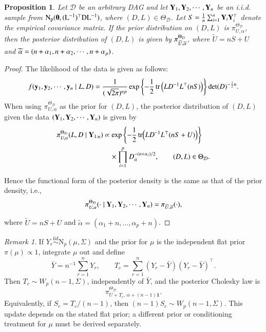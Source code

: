 \documentclass[12pt]{article}
\DeclareMathOperator{\tr}{tr}
\newcommand{\D}{\mathcal{D}}
\theoremstyle{plain}
\newtheorem{proposition}[theorem]{Proposition}
\theoremstyle{definition}
\theoremstyle{remark}
\newtheorem{Rem}[theorem]{Remark}
\begin{document}
\begin{proposition}\label{lem:pd}
Let $\D$ be an arbitrary DAG and let ${\bf Y}_1, {\bf Y}_2, \cdots, {\bf Y}_n$ be an i.i.d. sample from $\rm{N}_{p} ({\bf 0}, (L^{-1})^{\top}DL^{-1})$, where
$(D, L) \in \Theta_{\D}$. Let $S = \frac{1}{n} \sum_{i=1}^n {\bf Y}_i {\bf Y}_i^{\top}$ denote the empirical
covariance matrix. If the prior distribution on $(D, L)$ is $\pi_{U,\alpha}^{\Theta_{\D}}$, then the posterior distribution
of $(D, L)$ is given by $\pi_{\widetilde{U}, \widetilde{\bf \alpha}}^{\Theta_{\D}}$, where $\widetilde{U} = nS + U$ and $\widetilde{\bf \alpha} = (n + \alpha_1, n + \alpha_2, \cdots, n + \alpha_{p})$.
\end{proposition}
\begin{proof}
The likelihood of the data is given as follows:
\[
f({\bf y}_1, {\bf y}_2, \cdots, {\bf y}_n \mid L, D) = \frac{1}{(\sqrt{2 \pi})^{np}}\exp\left\{-
\frac{1}{2}\tr \left(LD^{-1}L^{\top} (nS) \right)\right\}\det(D)^{-\frac{1}{2}n}.
\]
\noindent When using $\pi_{U,\alpha}^{\Theta_{\D}}$ as the prior for $(D, L)$, the posterior distribution of $(D, L)$ given the
data $({\bf Y}_1, {\bf Y}_2, \cdots, {\bf Y}_n)$ is given by
\begin{equation}\label{eq:wishart_on_theta}
\begin{aligned}
\pi_{U,\alpha}^{\Theta_{\D}}(L,D\mid{\bf Y}_{1:n})
&\propto
\exp\left\{-\frac12\tr\!\left(LD^{-1}L^\top(nS+U)\right)\right\}\\
&\quad{}\times\prod_{i=1}^{p}D_{ii}^{-(n+\alpha_i)/2},
\qquad (D,L)\in\Theta_{\D}.
\end{aligned}
\end{equation}

\noindent
Hence the functional form of the posterior density is the same as that of the prior density, i.e.,
$$
\pi_{U,\alpha}^{\Theta_{\D}} ( \cdot \mid {\bf Y}_1, {\bf Y}_2, \cdots, {\bf Y}_n) =
\pi_{\widetilde{U}, \widetilde{\bf \alpha}} ( \cdot ),
$$

\noindent
where $\widetilde{U} = nS + U$ and $\widetilde{\alpha}= (\alpha_1+n,\ldots,\alpha_{p}+n)$.
\end{proof}
\begin{Rem}\label{rem:unknown-mean}
If \(Y_r\stackrel{\mathrm{iid}}{\sim}\mathrm{N}_p(\mu,\Sigma)\) and
the prior for \(\mu\) is the independent flat prior
\(\pi(\mu)\propto1\), integrate \(\mu\) out and define
\[
\bar Y=n^{-1}\sum_{r=1}^nY_r,\qquad
T_c=\sum_{r=1}^n(Y_r-\bar Y)(Y_r-\bar Y)^\top .
\]
Then \(T_c\sim W_p(n-1,\Sigma)\), independently of \(\bar Y\), and the
posterior Cholesky law is
\[
\pi_{U+T_c,\,\alpha+(n-1)\mathbf{1}}^{\Theta_{\D}}.
\]
Equivalently, if \(S_c=T_c/(n-1)\), then
\((n-1)S_c\sim W_p(n-1,\Sigma)\).  This update depends on the stated
flat prior; a different prior or conditioning treatment for \(\mu\)
must be derived separately.
\end{Rem}
\end{document}
